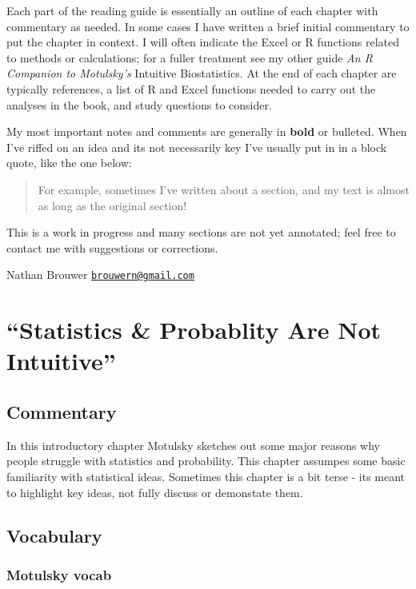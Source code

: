 \documentclass[]{book}
\theoremstyle{definition}
\theoremstyle{definition}
\theoremstyle{definition}
\theoremstyle{remark}
\begin{document}
Each part of the reading guide is essentially an outline of each chapter
with commentary as needed. In some cases I have written a brief initial
commentary to put the chapter in context. I will often indicate the
Excel or R functions related to methods or calculations; for a fuller
treatment see my other guide \emph{An R Companion to Motulsky's}
Intuitive Biostatistics. At the end of each chapter are typically
references, a list of R and Excel functions needed to carry out the
analyses in the book, and study questions to consider.

My most important notes and comments are generally in \textbf{bold} or
bulleted. When I've riffed on an idea and its not necessarily key I've
usually put in in a block quote, like the one below:

\begin{quote}
For example, sometimes I've written about a section, and my text is
almost as long as the original section!
\end{quote}

This is a work in progress and many sections are not yet annotated; feel
free to contact me with suggestions or corrections.

Nathan Brouwer
\href{mailto:brouwern@gmail.com}{\nolinkurl{brouwern@gmail.com}}

\chapter{\texorpdfstring{``Statistics \& Probablity Are Not
Intuitive''}{Statistics \& Probablity Are Not Intuitive}}\label{ch1}

\section*{Commentary}\label{commentary}

In this introductory chapter Motulsky sketches out some major reasons
why people struggle with statistics and probability. This chapter
assumpes some basic familiarity with statistical ideas. Sometimes this
chapter is a bit terse - its meant to highlight key ideas, not fully
discuss or demonstate them.

\section*{Vocabulary}\label{vocabulary}

\subsection*{Motulsky vocab}\label{motulsky-vocab}
\end{document}
